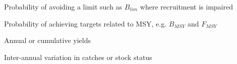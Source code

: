 \begin{description}[labelindent=\parindent,noitemsep,topsep=0pt,parsep=0pt,partopsep=0pt]
 \item[Safety] Probability of avoiding a limit such as  $B_{lim}$ where recruitment is impaired
 \item[Status] Probability of achieving targets related to MSY, e.g.  $B_{MSY}$ and $F_{MSY}$
 \item[Yield] Annual or cumulative yields
 \item[Variability] Inter-annual variation in catches or stock status
\end{description}






